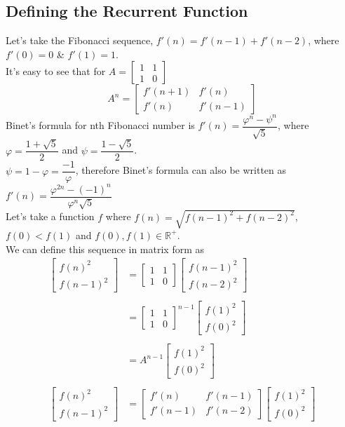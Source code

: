 \documentclass{article}
\begin{document}
\subsection{Defining the Recurrent Function}
Let's take the Fibonacci sequence, $f'(n) = f'(n - 1) + f'(n - 2)$, where $f'(0) = 0$ \& $f'(1) = 1$.\\
It's easy to see that for $A  = \begin{bmatrix}1 & 1 \\ 1 & 0 \end{bmatrix}$ $$A^n = \begin{bmatrix}f'(n + 1) & f'(n) \\ f'(n) & f'(n - 1)\end{bmatrix}$$
Binet's formula for nth Fibonacci number is $f'(n) = \dfrac{\varphi^n - \psi^n}{\sqrt{5}}$, where $\varphi = \dfrac{1 + \sqrt{5}}{2}$ and $\psi = \dfrac{1 - \sqrt{5}}{2}$\cite{BF-wiki}.\\
$\psi = 1 - \varphi = \dfrac{-1}{\varphi}$, therefore Binet's formula can also be written as 
$f'(n) = \dfrac{\varphi^{2n} - (-1)^n}{\varphi^n\sqrt{5}}$\\
Let's take a function \(f\) where $f(n) = \sqrt{f(n - 1)^2 + f(n - 2)^2}$, \(f(0) < f(1)\) and $f(0), f(1) \in \mathbb{R}^{+}$.\\
We can define this sequence in matrix form as
\begin{align*}
\begin{bmatrix}f(n)^2 \\f(n - 1)^2\end{bmatrix} 
&=
\begin{bmatrix}1 & 1\\1 & 0\end{bmatrix}
\begin{bmatrix}f(n - 1)^2\\f(n - 2)^2\end{bmatrix} \\\\
&= \begin{bmatrix}1 & 1 \\1 & 0\end{bmatrix}^{\!n - 1}
\begin{bmatrix}f(1)^2\\f(0)^2\end{bmatrix}\\\\
&= A^{\!n - 1}\begin{bmatrix}f(1)^2\\f(0)^2\end{bmatrix}\\\\
\begin{bmatrix}f(n)^2 \\f(n - 1)^2\end{bmatrix}
&= \begin{bmatrix}f'(n) & f'(n - 1) \\ f'(n - 1) & f'(n - 2)\end{bmatrix}
\begin{bmatrix}f(1)^2 \\f(0)^2\end{bmatrix}\\
\end{align*}
\end{document}
